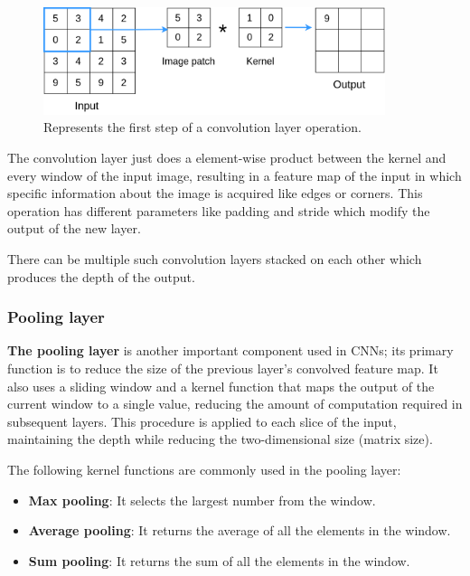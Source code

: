 \documentclass{report}[12pt, a4paper]
\begin{document}
\begin{figure}[htp]
    \centering
    \includegraphics[width=10cm]{convolution_layer_operation}
    \caption{Represents the first step of a convolution layer operation.}
    \label{fig:convolution_layer_operation}
\end{figure}

The convolution layer just does a element-wise product between the kernel and every window of the input image, resulting in a feature map of the input in which specific information about the image is acquired like edges or corners. This operation has different parameters like padding and stride which modify the output of the new layer.

There can be multiple such convolution layers stacked on each other which produces the depth of the output.

\subsubsection{Pooling layer}

\textbf{The pooling layer} is another important component used in CNNs; its primary function is to reduce the size of the previous layer's convolved feature map. It also uses a sliding window and a kernel function that maps the output of the current window to a single value, reducing the amount of computation required in subsequent layers. This procedure is applied to each slice of the input, maintaining the depth while reducing the two-dimensional size (matrix size).

The following kernel functions are commonly used in the pooling layer:

\begin{itemize}
    \item \textbf{Max pooling}: It selects the largest number from the window.
    \item \textbf{Average pooling}: It returns the average of all the elements in the window.
    \item \textbf{Sum pooling}: It returns the sum of all the elements in the window.
\end{itemize}
\end{document}
